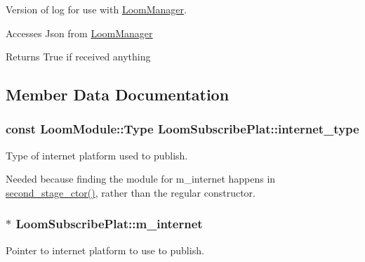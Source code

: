 Version of log for use with \hyperlink{class_loom_manager}{Loom\+Manager}. 

Accesses Json from \hyperlink{class_loom_manager}{Loom\+Manager} \begin{DoxyReturn}{Returns}
True if received anything 
\end{DoxyReturn}


\subsection{Member Data Documentation}
\subsubsection[{\texorpdfstring{internet\+\_\+type}{internet_type}}]{\setlength{\rightskip}{0pt plus 5cm}const {\bf Loom\+Module\+::\+Type} Loom\+Subscribe\+Plat\+::internet\+\_\+type\hspace{0.3cm}{\ttfamily [protected]}}\hypertarget{class_loom_subscribe_plat_ac1f89a414dd68151b156c3d76a5cbffe}{}\label{class_loom_subscribe_plat_ac1f89a414dd68151b156c3d76a5cbffe}


Type of internet platform used to publish. 

Needed because finding the module for m\+\_\+internet happens in \hyperlink{class_loom_subscribe_plat_a5394d492cec0f9403d0442ea46bce2db}{second\+\_\+stage\+\_\+ctor()}, rather than the regular constructor. 
\subsubsection[{\texorpdfstring{m\+\_\+internet}{m_internet}}]{$\ast$ Loom\+Subscribe\+Plat\+::m\+\_\+internet\hspace{0.3cm}{\ttfamily [protected]}}\hypertarget{class_loom_subscribe_plat_ab3992d3d1cc20c9e46794142f5e778e2}{}\label{class_loom_subscribe_plat_ab3992d3d1cc20c9e46794142f5e778e2}


Pointer to internet platform to use to publish. 

